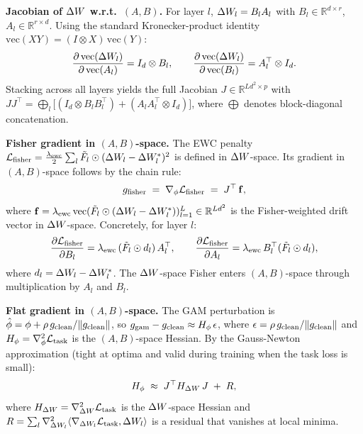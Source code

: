 \textbf{Jacobian of $\Delta W$ w.r.t.\ $(A, B)$.}
For layer $l$, $\Delta W_l = B_l A_l$ with $B_l\in\mathbb{R}^{d\times r}$,
$A_l\in\mathbb{R}^{r\times d}$.
Using the standard Kronecker-product identity $\mathrm{vec}(XY)=(I\otimes X)\,\mathrm{vec}(Y)$:
\begin{equation}
  \frac{\partial\,\mathrm{vec}(\Delta W_l)}{\partial\,\mathrm{vec}(A_l)}
    = I_d \otimes B_l,
  \qquad
  \frac{\partial\,\mathrm{vec}(\Delta W_l)}{\partial\,\mathrm{vec}(B_l)}
    = A_l^\top \otimes I_d.
  \label{eq:jacobian}
\end{equation}
Stacking across all layers yields the full Jacobian
$J \in \mathbb{R}^{Ld^2 \times p}$ with
$JJ^\top = \bigoplus_l \bigl[(I_d\otimes B_lB_l^\top) + (A_lA_l^\top\otimes I_d)\bigr]$,
where $\bigoplus$ denotes block-diagonal concatenation.

\textbf{Fisher gradient in $(A,B)$-space.}
The EWC penalty $\mathcal{L}_{\mathrm{fisher}} = \tfrac{\lambda_{\mathrm{ewc}}}{2}\sum_l \tilde{F}_l\odot(\Delta W_l-\Delta W_l^*)^2$
is defined in $\Delta W$-space.
Its gradient in $(A,B)$-space follows by the chain rule:
\begin{equation}
  g_{\mathrm{fisher}} \;=\; \nabla_\phi\mathcal{L}_{\mathrm{fisher}} \;=\; J^\top\, \mathbf{f},
  \label{eq:gfisher_chain}
\end{equation}
where $\mathbf{f} = \lambda_{\mathrm{ewc}}\,\mathrm{vec}(\tilde{F}_l\odot(\Delta W_l-\Delta W_l^*))_{l=1}^L
\in\mathbb{R}^{Ld^2}$ is the Fisher-weighted drift vector in $\Delta W$-space.
Concretely, for layer $l$:
\begin{equation}
  \frac{\partial\mathcal{L}_{\mathrm{fisher}}}{\partial B_l} = \lambda_{\mathrm{ewc}}\,(\tilde{F}_l\odot d_l)\,A_l^\top,
  \qquad
  \frac{\partial\mathcal{L}_{\mathrm{fisher}}}{\partial A_l} = \lambda_{\mathrm{ewc}}\,B_l^\top(\tilde{F}_l\odot d_l),
  \label{eq:gfisher_explicit}
\end{equation}
where $d_l = \Delta W_l - \Delta W_l^*$.
The $\Delta W$-space Fisher enters $(A,B)$-space through multiplication by $A_l$ and $B_l$.

\textbf{Flat gradient in $(A,B)$-space.}
The GAM perturbation is $\hat\phi = \phi + \rho\,g_{\mathrm{clean}}/\|g_{\mathrm{clean}}\|$,
so $g_{\mathrm{gam}} - g_{\mathrm{clean}} \approx H_\phi\,\epsilon$,
where $\epsilon = \rho\,g_{\mathrm{clean}}/\|g_{\mathrm{clean}}\|$ and $H_\phi = \nabla^2_\phi\mathcal{L}_{\mathrm{task}}$
is the $(A,B)$-space Hessian.
By the Gauss-Newton approximation (tight at optima and valid during training
when the task loss is small):
\begin{equation}
  H_\phi \;\approx\; J^\top H_{\Delta W}\, J \;+\; R,
  \label{eq:hessian_chain}
\end{equation}
where $H_{\Delta W} = \nabla^2_{\Delta W}\mathcal{L}_{\mathrm{task}}$ is the $\Delta W$-space Hessian and
$R = \sum_l\nabla^2_{\Delta W_l}\langle\nabla_{\Delta W_l}\mathcal{L}_{\mathrm{task}}, \Delta W_l\rangle$
is a residual that vanishes at local minima.

